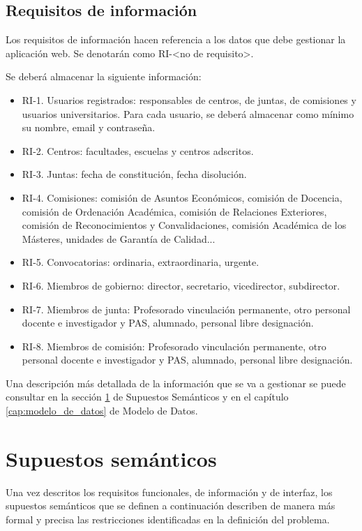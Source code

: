 \subsection{Requisitos de información}\label{sec:requisitos-información}

Los requisitos de información hacen referencia a los datos que debe gestionar la aplicación web. Se denotarán como RI-<no de requisito>.

Se deberá almacenar la siguiente información:
\begin{itemize}
    \item RI-1. Usuarios registrados: responsables de centros, de juntas, de comisiones y usuarios universitarios. Para cada usuario, se deberá almacenar como mínimo su nombre, email y contraseña.
    \item RI-2. Centros: facultades, escuelas y centros adscritos.
    \item RI-3. Juntas: fecha de constitución, fecha disolución.
    \item RI-4. Comisiones: comisión de Asuntos Económicos, comisión de Docencia, comisión de Ordenación Académica, comisión de Relaciones Exteriores, comisión de Reconocimientos y Convalidaciones, comisión Académica de los Másteres, unidades de Garantía de Calidad...
    \item RI-5. Convocatorias: ordinaria, extraordinaria, urgente.
    \item RI-6. Miembros de gobierno: director, secretario, vicedirector, subdirector.
    \item RI-7. Miembros de junta: Profesorado vinculación permanente, otro personal docente e investigador y  PAS, alumnado, personal libre designación.
    \item RI-8. Miembros de comisión: Profesorado vinculación permanente, otro personal docente e investigador y  PAS, alumnado, personal libre designación.
\end{itemize}

        
Una descripción más detallada de la información que se va a gestionar se puede consultar en la sección \ref{sec:supuestos-semanticos} de Supuestos Semánticos y en el capítulo \ref{cap:modelo_de_datos} de Modelo de Datos.

 \section{Supuestos semánticos}\label{sec:supuestos-semanticos}

Una vez descritos los requisitos funcionales, de información y de interfaz, los supuestos semánticos que se definen a continuación describen de manera más formal y precisa las restricciones identificadas en la definición del problema.
